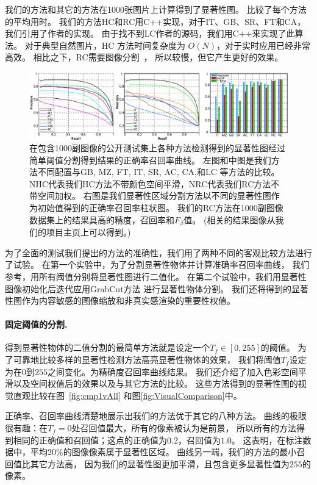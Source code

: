 \documentclass[final]{cvpr}
\newcommand{\IT}{IT\cite{98pami/Itti}}
\newcommand{\MZ}{MZ\cite{03ACMMM/Ma_Contrast-based}}
\newcommand{\GB}{GB\cite{conf/nips/HarelKP06}}
\newcommand{\SR}{SR\cite{07cvpr/hou_SpectralResidual}}
\newcommand{\FT}{FT\cite{09cvpr/Achanta_FTSaliency}}
\newcommand{\CA}{CA\cite{10cvpr/goferman_context}}
\newcommand{\LC}{LC\cite{06acmmm/ZhaiS_spatiotemporal}}
\newcommand{\AC}{AC\cite{08cvs/achanta_salient}}
\newcommand{\mypara}[1]{\paragraph{#1.}}
\begin{document}
我们的方法和其它的方法在1000张图片上计算得到了显著性图。
 比较了每个方法的平均用时。
我们的方法HC和RC用C++实现，对于IT、GB、SR、FT和CA，我们引用了作者的实现。
由于找不到LC作者的源码，我们用C++来实现了此算法。
对于典型自然图片，HC 方法时间复杂度为 $O(N)$，对于实时应用已经非常高效。
相比之下，RC需要图像分割~\cite{04ijcv/felzenszwalb_efficient}，
所以较慢，但它产生更好的效果。

\begin{figure}[t]
  \centering
  \includegraphics[width=\textwidth]{plots.pdf}
  \caption{在包含1000副图像的公开测试集上各种方法检测得到的显著性图经过
      简单阈值分割得到结果的正确率召回率曲线。
      左图和中图是我们方法不同配置与\GB, \MZ,  \FT, \IT, \SR, \AC, \CA,和\LC
      等方法的比较。
      NHC代表我们HC方法不带颜色空间平滑，NRC代表我们RC方法不带空间加权。
      右图是我们显著性区域分割方法以不同的显著性图作为初始值得到的正确率召回率柱状图。
      我们的RC方法在1000副图像数据集上的结果具高的精度，召回率和$F_{\beta}$值。
      (相关的结果图像从我们的项目主页上可以得到。)
  } \label{fig:plots}
\end{figure}

为了全面的测试我们提出的方法的准确性，我们用了两种不同的客观比较方法进行了试验。
在第一个实验中，为了分割显著性物体并计算准确率召回率曲线，
我们参考\cite{09cvpr/Achanta_FTSaliency}，用所有阈值分别将显著性图进行二值化。
在第二个试验中，我们用显著性图像初始化后迭代应用GrabCut方法
\cite{04tog/rother_grabcut}进行显著性物体分割。
我们还将得到的显著性图作为内容敏感的图像缩放和非真实感渲染的重要性权值。



\mypara{固定阈值的分割}
得到显著性物体的二值分割的最简单方法就是设定一个$T_f \in [0, 255]$的阈值。
为了可靠地比较多样的显著性检测方法高亮显著性物体的效果，
我们将阈值$T_f$设定为在$0$到$255$之间变化。为精确度召回率曲线结果。
我们还介绍了加入色彩空间平滑以及空间权值后的效果以及与其它方法的比较。
这些方法得到的显著性图的视觉直观比较在图~\ref{fig:cmp1vAll}
和图\ref{fig:VisualComparison}中。

正确率、召回率曲线清楚地展示出我们的方法优于其它的八种方法。
曲线的极限很有趣：在$T_f=0$处召回值最大，所有的像素被认为是前景，
所以所有的方法得到相同的正确值和召回值；这点的正确值为$0.2$，召回值为$1.0$。
这表明，在标注数据中，平均$20\%$的图像像素属于显著性区域。
曲线另一端，我们的方法的最小召回值比其它方法高，
因为我们的显著性图更加平滑，且包含更多显著性值为$255$的像素。
\end{document}

